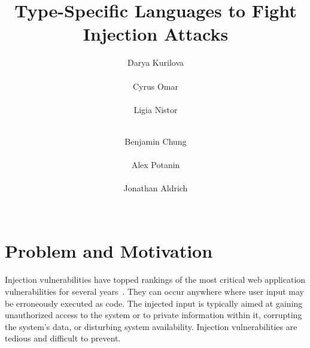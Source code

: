 \documentclass{sig-alternate}
\newcommand{\qs}[1]{}%
\begin{document}

\title{Type-Specific Languages to Fight Injection Attacks}


\author{
\alignauthor Darya Kurilova\\
       \\
\alignauthor Cyrus Omar\\
       \\
\alignauthor Ligia Nistor\\
       \\
\and  %
\alignauthor Benjamin Chung\\
       \\
\alignauthor Alex Potanin\\
       \\
\alignauthor Jonathan Aldrich\\
       \\
}

\maketitle

%

\section{Problem and Motivation}
\qs{Clearly state the problem being addressed and explain the reasons for seeking a solution to this problem.}

Injection vulnerabilities have topped rankings of the most critical web application vulnerabilities for several years~\cite{cwsans,owasp}. They can occur anywhere where user input may be erroneously executed as code. The injected input is typically aimed at gaining unauthorized access to the system or to private information within it, corrupting the system's data, or disturbing system availability. Injection vulnerabilities are tedious and difficult to prevent.
\end{document}
